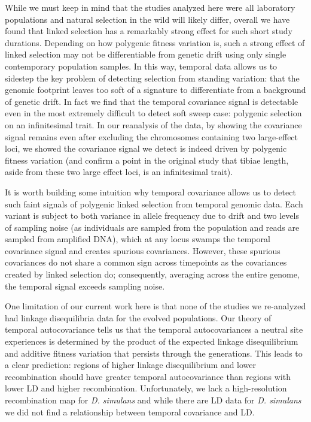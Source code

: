 \documentclass[11pt]{article}
\begin{document}
While we must keep in mind that the studies analyzed here were all laboratory
populations and natural selection in the wild will likely differ, overall we
have found that linked selection has a remarkably strong effect for such short
study durations. Depending on how polygenic fitness variation is, such a strong
effect of linked selection may not be differentiable from genetic drift using
only single contemporary population samples. In this way, temporal data allows
us to sidestep the key problem of detecting selection from standing variation:
that the genomic footprint leaves too soft of a signature to differentiate from
a background of genetic drift. In fact we find that the temporal covariance
signal is detectable even in the most extremely difficult to detect soft sweep
case: polygenic selection on an infinitesimal trait. In our reanalysis of the
\textcite{Castro2019-uk} data, by showing the covariance signal remains even
after excluding the chromosomes containing two large-effect loci, we showed the
covariance signal we detect is indeed driven by polygenic fitness variation
(and confirm a point in the original study that tibiae length, aside from these
two large effect loci, is an infinitesimal trait). 

It is worth building some intuition why temporal covariance allows us to detect
such faint signals of polygenic linked selection from temporal genomic data.
Each variant is subject to both variance in allele frequency due to drift and
two levels of sampling noise (as individuals are sampled from the population
and reads are sampled from amplified DNA), which at any locus swamps the
temporal covariance signal and creates spurious covariances. However, these
spurious covariances do not share a common sign across timepoints as the
covariances created by linked selection do; consequently, averaging across the
entire genome, the temporal signal exceeds sampling noise.

One limitation of our current work here is that none of the studies we
re-analyzed had linkage disequilibria data for the evolved populations. Our
theory of temporal autocovariance tells us that the temporal autocovariances a
neutral site experiences is determined by the product of the expected linkage
disequilibrium and additive fitness variation that persists through the
generations. This leads to a clear prediction: regions of higher linkage
disequilibrium and lower recombination should have greater temporal
autocovariance than regions with lower LD and higher recombination.
Unfortunately, we lack a high-resolution recombination map for \emph{D.
simulans} and while there are LD data for \emph{D. simulans}
\parencite{Signor2018-wg} we did not find a relationship between temporal
covariance and LD. 
\end{document}

